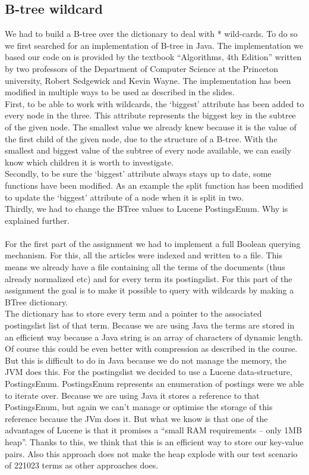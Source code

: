 \documentclass{article}
\begin{document}
\subsection{B-tree wildcard}
We had to build a B-tree over the dictionary to deal with * wild-cards. To do so we first searched for an implementation of B-tree in Java. The implementation we based our code on is provided by the textbook ``Algorithms, 4th Edition'' written by two professors of the Department of Computer Science at the Princeton university,  Robert Sedgewick and Kevin Wayne.
The implementation has been modified in multiple ways to be used as described in the slides.\\
First, to be able to work with wildcards, the `biggest' attribute has been added to every node in the three. This attribute represents the biggest key in the subtree of the given node. The smallest value we already knew because it is the value of the first child of the given node, due to the structure of a B-tree. With the smallest and biggest value of the subtree of every node available, we can easily know which children it is worth to investigate.\\
Secondly, to be sure the `biggest' attribute always stays up to date, some functions have been modified. As an example the split function has been modified to update the `biggest' attribute of a node when it is split in two.\\
Thirdly, we had to change the BTree values to Lucene PostingsEnum. Why is explained further.\\\\
For the first part of the assignment we had to implement a full Boolean querying mechanism. For this, all the articles were indexed and written to a file. This means we already have a file containing all the terms of the documents (thus already normalized etc) and for every term its postingslist. For this part of the assignment the goal is to make it possible to query with wildcards by making a BTree dictionary.\\
The dictionary has to store every term and a pointer to the associated postingslist list of that term. Because we are using Java the terms are stored in an efficient way because a Java string is an array of characters of dynamic length. Of course this could be even better with compression as described in the course. But this is difficult to do in Java because we do not manage the memory, the JVM does this. For the postingslist we decided to use a Lucene data-structure, PostingsEnum. PostingsEnum represents an enumeration of postings were we able to iterate over. Because we are using Java it stores a reference to that PostingsEnum, but again we can't manage or optimise the storage of this reference because the JVm does it. But what we know is that one of the advantages of Lucene is that it promises a ``small RAM requirements -- only 1MB heap''. Thanks to this, we think that this is an efficient way to store our key-value pairs. Also this approach does not make the heap explode with our test scenario of 221023 terms as other approaches does.\\
\end{document}
